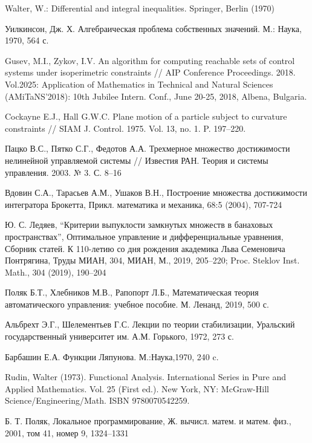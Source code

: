 \documentclass[../main.tex]{subfiles}
\begin{document}
\begin{thebibliography}{99}
Walter, W.: Differential and integral inequalities. Springer, Berlin (1970)

Уилкинсон, Дж. Х.
Алгебраическая проблема собственных значений.
М.: Наука, 1970, 564 с.

Gusev, M.I., Zykov, I.V.
An algorithm for computing reachable sets of control systems under isoperimetric constraints // AIP Conference Proceedings. 
2018. 
Vol.2025: Application of Mathematics in Technical and Natural Sciences 
(AMiTaNS'2018): 10th Jubilee Intern. Conf.,
 June 20-25, 2018, Albena, Bulgaria.

 Cockayne E.J., Hall G.W.C. Plane motion of a particle subject to curvature constraints // SIAM J. Control. 1975. Vol. 13, no. 1. P. 197--220.  

 Пацко В.С., Пятко С.Г., Федотов А.А. Трехмерное множество достижимости нелинейной управляемой системы // Известия РАН. Теория и системы управления. 2003. № 3. С. 8--16

 Вдовин С.А., Тарасьев А.М., Ушаков В.Н., Построение множества достижимости интегратора Брокетта, Прикл. математика и механика, 68:5 (2004), 707-724

 Ю. С. Ледяев, “Критерии выпуклости замкнутых множеств в банаховых пространствах”, Оптимальное управление и дифференциальные уравнения, Сборник статей. К 110-летию со дня рождения академика Льва Семеновича Понтрягина, Труды МИАН, 304, МИАН, М., 2019, 205–220; Proc. Steklov Inst. Math., 304 (2019), 190–204
 

 Поляк Б.Т., Хлебников М.В., Рапопорт Л.Б., Математическая теория автоматического управления: учебное пособие. М. Ленанд, 2019, 500 с.

 Альбрехт Э.Г., Шелементьев Г.С. Лекции по теории стабилизации, Уральский государственный университет им. А.М. Горького, 1972, 273 с.

Барбашин Е.А. Функции Ляпунова. М.:Наука,1970, 240 c.

Rudin, Walter (1973). Functional Analysis. International Series in Pure and Applied Mathematics. Vol. 25 (First ed.). New York, NY: McGraw-Hill Science/Engineering/Math. ISBN 9780070542259.

Б. Т. Поляк, Локальное программирование, Ж. вычисл. матем. и матем. физ., 2001, том 41, номер 9, 1324–1331


\end{thebibliography}
\end{document}
